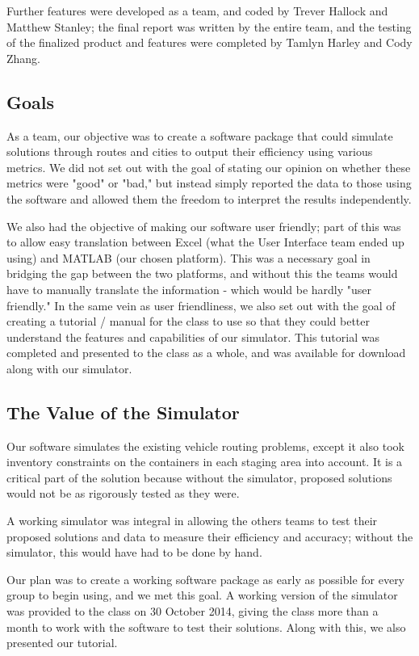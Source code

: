 \documentclass{article}
\begin{document}
Further features were developed as a team, and coded by Trever Hallock and Matthew Stanley; the final report was written by the entire team, and the testing of the finalized product and features were completed by Tamlyn Harley and Cody Zhang.


\subsection{Goals}

As a team, our objective was to create a software package that could simulate solutions through routes and cities to output their efficiency using various metrics.
We did not set out with the goal of stating our opinion on whether these metrics were "good" or "bad," but instead simply reported the data to those using the software and allowed them the freedom to interpret the results independently. 

We also had the objective of making our software user friendly; part of this was to allow easy translation between Excel (what the User Interface team ended up using) and MATLAB (our chosen platform).  
This was a necessary goal in bridging the gap between the two platforms, and without this the teams would have to manually translate the information - which would be hardly "user friendly." 
In the same vein as user friendliness, we also set out with the goal of creating a tutorial / manual for the class to use so that they could better understand the features and capabilities of our simulator. 
This tutorial was completed and presented to the class as a whole, and was available for download along with our simulator.


\subsection{The Value of the Simulator}

Our software simulates the existing vehicle routing problems, except it also took inventory constraints on the containers in each staging area into account. It is a critical part of the solution because without the simulator, proposed solutions would not be as rigorously tested as they were. 

A working simulator was integral in allowing the others teams to test their proposed solutions and data to measure their efficiency and accuracy; without the simulator, this would have had to be done by hand. 

Our plan was to create a working software package as early as possible for every group to begin using, and we met this goal. 
A working version of the simulator was provided to the class on 30 October 2014, giving the class more than a month to work with the software to test their solutions.  
Along with this, we also presented our tutorial.
\end{document}
